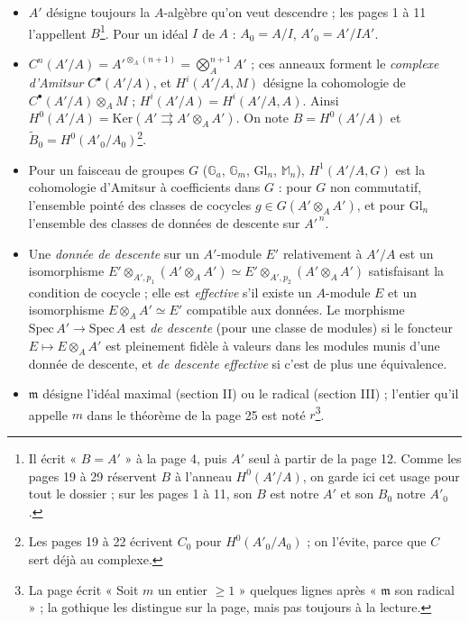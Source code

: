 \documentclass[11pt,a4paper]{article}
\begin{document}
\begin{itemize}
  \item $A'$ désigne toujours la $A$-algèbre qu'on veut descendre ; les pages
  1 à 11 l'appellent $B$\footnote{Il écrit « $B = A'$ » à la page 4, puis
  $A'$ seul à partir de la page 12. Comme les pages 19 à 29 réservent $B$ à
  l'anneau $H^0(A'/A)$, on garde ici cet usage pour tout le dossier ; sur
  les pages 1 à 11, son $B$ est notre $A'$ et son $B_0$ notre $A'_0$.}.
  Pour un idéal $I$ de $A$ : $A_0 = A/I$, $A'_0 = A'/IA'$.
  \item $C^n(A'/A) = A'^{\otimes_A (n+1)} = \bigotimes^{n+1}_A A'$ ; ces
  anneaux forment le \emph{complexe d'Amitsur} $C^{\bullet}(A'/A)$, et
  $H^i(A'/A, M)$ désigne la cohomologie de $C^{\bullet}(A'/A) \otimes_A M$ ;
  $H^i(A'/A) = H^i(A'/A, A)$. Ainsi $H^0(A'/A) = \mathrm{Ker}(A'
  \rightrightarrows A' \otimes_A A')$. On note $B = H^0(A'/A)$ et
  $\widetilde{B}_0 = H^0(A'_0/A_0)$\footnote{Les pages 19 à 22 écrivent
  $C_0$ pour $H^0(A'_0/A_0)$ ; on l'évite, parce que $C$ sert déjà au
  complexe.}.
  \item Pour un faisceau de groupes $G$ ($\mathbb{G}_a$, $\mathbb{G}_m$,
  $\mathrm{Gl}_n$, $\mathbb{M}_n$), $H^1(A'/A, G)$ est la cohomologie
  d'Amitsur à coefficients dans $G$ : pour $G$ non commutatif, l'ensemble
  pointé des classes de cocycles $g \in G(A' \otimes_A A')$, et pour
  $\mathrm{Gl}_n$ l'ensemble des classes de données de descente sur
  $A'^{\,n}$.
  \item Une \emph{donnée de descente} sur un $A'$-module $E'$ relativement à
  $A'/A$ est un isomorphisme $E' \otimes_{A', p_1} (A' \otimes_A A') \simeq
  E' \otimes_{A', p_2} (A' \otimes_A A')$ satisfaisant la condition de
  cocycle ; elle est \emph{effective} s'il existe un $A$-module $E$ et un
  isomorphisme $E \otimes_A A' \simeq E'$ compatible aux données. Le
  morphisme $\mathrm{Spec}\, A' \to \mathrm{Spec}\, A$ est \emph{de
  descente} (pour une classe de modules) si le foncteur $E \mapsto E
  \otimes_A A'$ est pleinement fidèle à valeurs dans les modules munis d'une
  donnée de descente, et \emph{de descente effective} si c'est de plus une
  équivalence.
  \item $\mathfrak{m}$ désigne l'idéal maximal (section II) ou le radical
  (section III) ; l'entier qu'il appelle $m$ dans le théorème de la page 25
  est noté $r$\footnote{La page écrit « Soit $m$ un entier $\geqslant 1$ »
  quelques lignes après « $\mathfrak{m}$ son radical » ; la gothique les
  distingue sur la page, mais pas toujours à la lecture.}.
\end{itemize}
\end{document}
